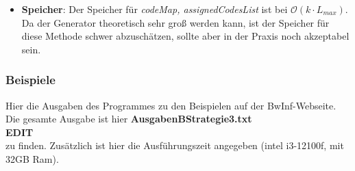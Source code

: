 \documentclass[a4paper,10pt,ngerman]{scrartcl}
\begin{document}
\begin{itemize}
\begin{itemize}
    \item \textbf{Speicher}:
    Der Speicher für \textit{codeMap, assignedCodesList} ist bei $\mathcal{O}(k\cdot L_{max})$. Da der Generator theoretisch sehr groß werden kann, ist der Speicher für diese Methode schwer abzuschätzen, sollte aber in der Praxis noch akzeptabel sein.
  \end{itemize}

\end{itemize}
\subsubsection{Beispiele}
Hier die Ausgaben des Programmes zu den Beispielen auf der BwInf-Webseite. Die gesamte Ausgabe ist hier \textbf{AusgabenBStrategie3.txt} \\ \newline \textbf{EDIT} \\ \newline zu finden. Zusätzlich ist hier die Ausführungszeit angegeben (intel i3-12100f, mit 32GB Ram).
\end{document}
